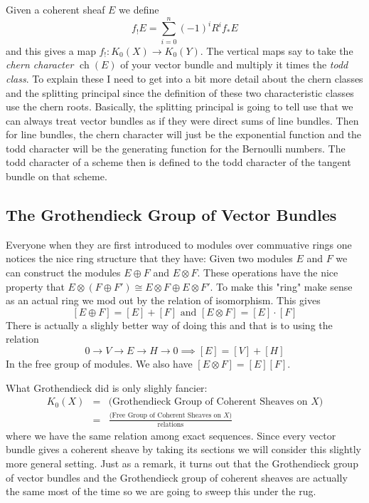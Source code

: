 \documentclass[12pt]{article}
\numberwithin{equation}{section}
\theoremstyle{definition}
\theoremstyle{remark}
\newcommand{\ch}{\operatorname{ch}}
\begin{document}
Given a coherent sheaf $E$ we define 
$$ f_!E = \sum_{i=0}^n (-1)^iR^if_*E $$
and this gives a map $f_!:K_0(X) \to K_0(Y)$.
The vertical maps say to take the \emph{chern character} $\ch(E)$ of your vector bundle and multiply it times the \emph{todd class}. 
To explain these I need to get into a bit more detail about the chern classes and the splitting principal since the definition of these two characteristic classes use the chern roots. 
Basically, the splitting principal is going to tell use that we can always treat vector bundles as if they were direct sums of line bundles. 
Then for line bundles, the chern character will just be the exponential function and the todd character will be the generating function for the Bernoulli numbers. 
The todd character of a scheme then is defined to the todd character of the tangent bundle on that scheme.

\subsection{The Grothendieck Group of Vector Bundles}
Everyone when they are first introduced to modules over commuative rings one notices the nice ring structure that they have: 
Given two modules $E$ and $F$ we can construct the modules $E \oplus F $ and $E \otimes F$.
These operations have the nice property that $E \otimes( F \oplus F') \cong E \otimes F \oplus E \otimes F'$.
To make this "ring" make sense as an actual ring we mod out by the relation of isomorphism. 
This gives
$$[E \oplus F ] = [E] + [F] \mbox{ and } [E \otimes F] = [E] \cdot [F] $$
There is actually a slighly better way of doing this and that is to using the relation
$$0 \to V \to E \to H \to 0 \implies [E] = [V] + [H] $$
In the free group of modules. 
We also have $[E\otimes F] = [E][F]$.

What Grothendieck did is only slighly fancier:
\begin{eqnarray*}
	K_0(X) &=& \mbox{(Grothendieck Group of Coherent Sheaves on $X$)}\\
	&=& \frac{\mbox{(Free Group of Coherent Sheaves on $X$)} }{\mbox{relations}}
\end{eqnarray*}
where we have the same relation among exact sequences. 
Since every vector bundle gives a coherent sheave by taking its sections we will consider this slightly more general setting.
Just as a remark, it turns out that the Grothendieck group of vector bundles and the Grothendieck group of coherent sheaves are actually the same most of the time so we are going to sweep this under the rug.
\end{document}
